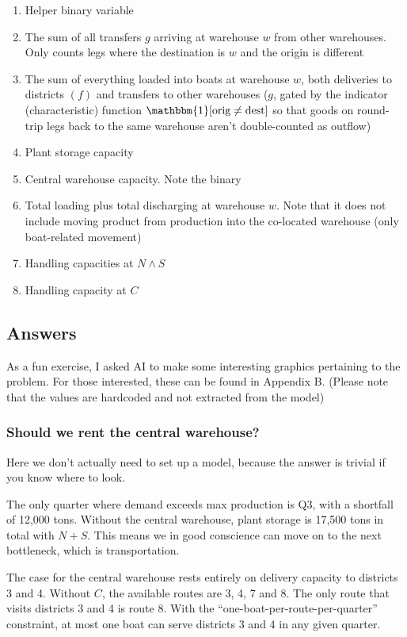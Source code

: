 \documentclass[10pt]{article}
\begin{document}
\begin{enumerate}
    \item Helper binary variable 
    \item The sum of all transfers $g $ arriving at warehouse $w $ from other warehouses. Only counts legs where the destination is $w $ and the origin is different 
    \item The sum of everything loaded into boats at warehouse $w $, both deliveries to districts $(f) $ and transfers to other warehouses ($g $, gated by the indicator (characteristic) function $\mathbbm{1}[\text{orig}\neq\text{dest}] $ so that goods on round-trip legs back to the same warehouse aren't double-counted as outflow) 
    \item Plant storage capacity 
    \item Central warehouse capacity. Note the binary 
    \item Total loading plus total discharging at warehouse $w $. Note that it does not include moving product from production into the co-located warehouse (only boat-related movement)
    \item Handling capacities at $N\land S $
    \item Handling capacity at $C $
\end{enumerate}
\newpage 
\subsection{Answers}
As a fun exercise, I asked AI to make some interesting graphics pertaining to the problem. For those interested, these can be found in Appendix B. (Please note that the values are hardcoded and not extracted from the model)
\subsubsection{Should we rent the central warehouse?}
Here we don't actually need to set up a model, because the answer is trivial if you know where to look. 

The only quarter where demand exceeds max production is Q3, with a shortfall of 12,000 tons. Without the central warehouse, plant storage is 17,500 tons in total with $N + S $. This means we in good conscience can move on to the next bottleneck, which is transportation. 

The case for the central warehouse rests entirely on delivery capacity to districts 3 and 4. Without $C $, the available routes are 3, 4, 7 and 8. The only route that visits districts 3 and 4 is route 8. With the ``one-boat-per-route-per-quarter'' constraint, at most one boat can serve districts 3 and 4 in any given quarter. 
\end{document}
